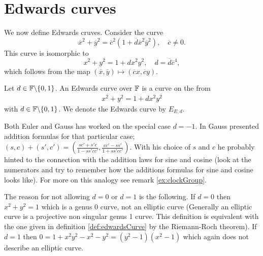 \section{Edwards curves}
\label{sec:EdwardC}
We now define Edwards cruves. Consider the curve 
\[	\overline{x}^2+\overline{y}^2=\overline{c}^2(1+\overline{d}\overline{x}^2\overline{y}^2),\quad \overline{c}\neq 0.
\]
This curve is isomorphic to 
\[
	x^2+y^2=1+dx^2y^2, \quad d=\overline{d}\overline{c}^4,
\]
which follows from the map $(\overline{x},\overline{y})\mapsto (\overline{c}x,\overline{c}y)$.
\begin{defn}\label{def:edwardsCurve}
Let $d\in\mathbb{F}\backslash\{0,1\}$. An Edwards curve over $\mathbb{F}$ is a curve on the from 
\begin{align}\label{rel:EC}
	x^2+y^2=1+dx^2y^2
\end{align}
with $d\in\mathbb{F}\backslash\{0,1\}$. We denote the Edwards curve by $E_{E,d}$. 
\end{defn}
Both Euler and Gauss has worked on the special case $d=-1$. In \cite{gaussWerke} Gauss presented addition formulas for that particular case; $(s,c)+(s',c')=\left(\frac{sc'+s'c}{1-ss'cc'},\frac{cc'-ss'}{1+ss'cc'}\right)$. With his choice of $s$ and $c$ he probably hinted to the connection with the addition laws for sine and cosine (look at the numerators and try to remember how the additions formulas for sine and cosine looks like). For more on this analogy see remark \ref{ex:clockGroup}.
\begin{rem}
The reason for not allowing $d=0$ or $d=1$ is the following. If $d=0$ then $x^2+y^2=1$ which is a genus 0 curve, not an elliptic curve (Generally an elliptic curve is a projective non singular genus 1 curve. This definition is equivalent with the one given in definition \ref{def:edwardsCurve} by the Riemann-Roch theorem). If $d=1$ then $0=1+x^2y^2-x^2-y^2=(y^2-1)(x^2-1)$ which again does not describe an elliptic curve. 
\end{rem}
